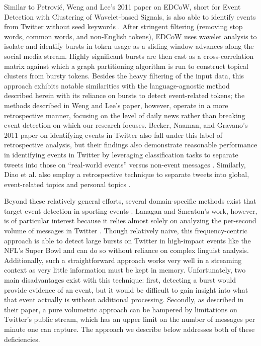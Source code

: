 \documentclass{acm_proc_article-sp}
\begin{document}
Similar to Petrovi\'{c}, Weng and Lee's 2011 paper on EDCoW, short for Event Detection with Clustering of Wavelet-based Signals, is also able to identify events from Twitter without seed keywords \cite{weng2011event}.
After stringent filtering (removing stop words, common words, and non-English tokens), EDCoW uses wavelet analysis to isolate and identify bursts in token usage as a sliding window advances along the social media stream.
Highly significant bursts are then cast as a cross-correlation matrix against which a graph partitioning algorithm is run to construct topical clusters from bursty tokens.
Besides the heavy filtering of the input data, this approach exhibits notable similarities with the language-agnostic method described herein with its reliance on bursts to detect event-related tokens; the methods described in Weng and Lee's paper, however, operate in a more retrospective manner, focusing on the level of daily news rather than breaking event detection on which our research focuses.
Becker, Naaman, and Gravano's 2011 paper on identifying events in Twitter also fall under this label of retrospective analysis, but their findings also demonstrate reasonable performance in identifying events in Twitter by leveraging classification tasks to separate tweets into those on ``real-world events'' versus non-event messages \cite{becker2011beyond-tr,becker2011beyond}.
Similarly, Diao et al. also employ a retrospective technique to separate tweets into global, event-related topics and personal topics \cite{diao2012finding}.

Beyond these relatively general efforts, several domain-specific methods exist that target event detection in sporting events \cite{vasudevan2013twitter,Zhao2011,lanagan2011using}.
Lanagan and Smeaton's work, however, is of particular interest because it relies almost solely on analyzing the per-second volume of messages in Twitter \cite{lanagan2011using}.
Though relatively naive, this frequency-centric approach is able to detect large bursts on Twitter in high-impact events like the NFL's Super Bowl and can do so without reliance on complex linguist analysis.
Additionally, such a straightforward approach works very well in a streaming context as very little information must be kept in memory.
Unfortunately, two main disadvantages exist with this technique: first, detecting a burst would provide evidence of an event, but it would be difficult to gain insight into what that event actually is without additional processing.
Secondly, as described in their paper, a pure volumetric approach can be hampered by limitations on Twitter's public stream, which has an upper limit on the number of messages per minute one can capture.
The approach we describe below addresses both of these deficiencies.
\end{document}
